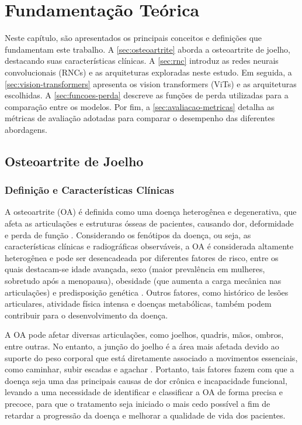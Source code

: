 \chapter{Fundamentação Teórica}\label{cap:fundamentacao}

Neste capítulo, são apresentados os principais conceitos e definições que fundamentam este trabalho. A \autoref{sec:osteoartrite} aborda a osteoartrite de joelho, destacando suas características clínicas. A \autoref{sec:rnc} introduz as redes neurais convolucionais (RNCs) e as arquiteturas exploradas neste estudo. Em seguida, a \autoref{sec:vision-transformers} apresenta os vision transformers (ViTs) e as arquiteturas escolhidas. A \autoref{sec:funcoes-perda} descreve as funções de perda utilizadas para a comparação entre os modelos. Por fim, a \autoref{sec:avaliacao-metricas} detalha as métricas de avaliação adotadas para comparar o desempenho das diferentes abordagens.

\section{Osteoartrite de Joelho}\label{sec:osteoartrite}

\subsection{Definição e Características Clínicas}

A osteoartrite (OA) é definida como uma doença heterogênea e degenerativa, que afeta as articulações e estruturas ósseas de pacientes, causando dor, deformidade e perda de função \cite{Loeser2012}. Considerando os fenótipos da doença, ou seja, as características clínicas e radiográficas observáveis, a OA é considerada altamente heterogênea e pode ser desencadeada por diferentes fatores de risco, entre os quais destacam-se idade avançada, sexo (maior prevalência em mulheres, sobretudo após a menopausa), obesidade (que aumenta a carga mecânica nas articulações) e predisposição genética \cite{ShaneAnderson2010, Tschon2021, PACCA2018, Spector2004}. Outros fatores, como histórico de lesões articulares, atividade física intensa e doenças metabólicas, também podem contribuir para o desenvolvimento da doença.

A OA pode afetar diversas articulações, como joelhos, quadris, mãos, ombros, entre outras. No entanto, a junção do joelho é a área mais afetada devido ao suporte do peso corporal que está diretamente associado a movimentos essenciais, como caminhar, subir escadas e agachar \cite{Kanamoto2020}. Portanto, tais fatores fazem com que a doença seja uma das principais causas de dor crônica e incapacidade funcional, levando a uma necessidade de identificar e classificar a OA de forma precisa e precoce, para que o tratamento seja iniciado o mais cedo possível a fim de retardar a progressão da doença e melhorar a qualidade de vida dos pacientes.

